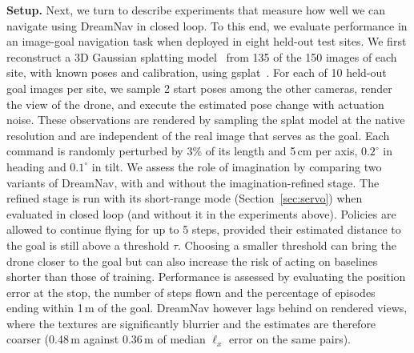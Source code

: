 \noindent \textbf{Setup.} Next, we turn to describe experiments that measure how well we can navigate using DreamNav in closed loop. To this end, we evaluate performance in an image-goal navigation task when deployed in eight held-out test sites. We first reconstruct a 3D Gaussian splatting model~\citep{kerbl20233d} from 135 of the 150 images of each site, with known poses and calibration, using gsplat~\citep{ye2025gsplat}. For each of 10 held-out goal images per site, we sample 2 start poses among the other cameras, render the view of the drone, and execute the estimated pose change with actuation noise. These observations are rendered by sampling the splat model at the native resolution and are independent of the real image that serves as the goal. Each command is randomly perturbed by 3\% of its length and 5\,cm per axis, $0.2^\circ$ in heading and $0.1^\circ$ in tilt. We assess the role of imagination by comparing two variants of DreamNav, with and without the imagination-refined stage. The refined stage is run with its short-range mode (Section~\ref{sec:servo}) when evaluated in closed loop (and without it in the experiments above). Policies are allowed to continue flying for up to 5 steps, provided their estimated distance to the goal is still above a threshold $\tau$. Choosing a smaller threshold can bring the drone closer to the goal but can also increase the risk of acting on baselines shorter than those of training. Performance is assessed by evaluating the position error at the stop, the number of steps flown and the percentage of episodes ending within 1\,m of the goal. DreamNav however lags behind on rendered views, where the textures are significantly blurrier and the estimates are therefore coarser (0.48\,m against 0.36\,m of median $\ell_x$ error on the same pairs).

